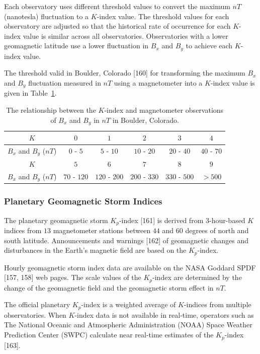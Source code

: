 \documentclass[sn-mathphys-num]{sn-jnl}%
\begin{document}
Each observatory uses different threshold values to convert the maximum $nT$ (nanotesla) fluctuation to a $K$-index value. The threshold values for each observatory are adjusted so that the historical rate of occurrence for each $K$-index value is similar across all observatories. Observatories with a lower geomagnetic latitude use a lower fluctuation in $B_{x}$ and $B_{y}$ to achieve each $K$-index value. 

The threshold valid in Boulder, Colorado [160] for transforming the maximum $B_{x}$ and $B_{y}$ fluctuation measured in $nT$ using a magnetometer into a $K$-index value is given in Table~\ref{tab:K}.

\begin{table}[!ht]
    \centering
    \caption{The relationship between the $K$-index and  magnetometer observations of $B_{x}$ and $B_{y}$ in $nT$ in Boulder, Colorado.}
    \label{tab:K}
    \begin{tabular}{|c|c|c|c|c|c|}
        \hline
        $K$ & $0$ & $1$ & $2$ & $3$ & $4$ \\ \hline
        $B_{x}$ and $B_{y}$ ($nT$)& $0$ - $5$ & $5$ - $10$ & $10$ - $20$ & $20$ - $40$ & $40$ - $70$ \\ \hline
        $K$ & $5$ & $6$ & $7$ & $8$ & $9$ \\ \hline
        $B_{x}$ and $B_{y}$ ($nT$) & $70$ - $120$ & $120$ - $200$ & $200$ - $330$ & $330$ - $500$ & $>500$ \\ \hline
    \end{tabular}
\end{table}

\subsubsection{Planetary Geomagnetic Storm Indices}

The planetary geomagnetic storm $K_{p}$-index [161] is derived from $3$-hour-based $K$ indices from $13$ magnetometer stations between $44$ and $60$ degrees of north and south latitude. Announcements and warnings [162] of geomagnetic changes and disturbances in the Earth's magnetic field are based on the $K_{p}$-index.

Hourly geomagnetic storm index data are available on the NASA Goddard SPDF [157, 158] web pages. The scale values of the $K_{p}$-index are determined by the change of the geomagnetic field and the geomagnetic storm effect in $nT$.

The official planetary $K_{p}$-index is a weighted average of $K$-indices from multiple observatories. When $K$-index data is not available in real-time, operators such as The National Oceanic and Atmospheric Administration (NOAA) Space Weather Prediction Center (SWPC) calculate near real-time estimates of the $K_{p}$-index [163].
\end{document}
